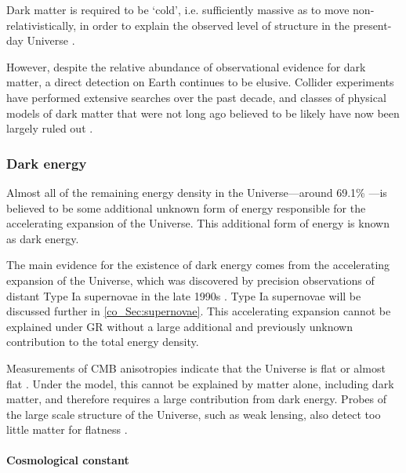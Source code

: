 Dark matter is required to be `cold', i.e. sufficiently massive as to move non-relativistically, in order to explain the observed level of structure in the present-day Universe \citep{Bond1982, Blumenthal1982, Peebles1982, Blumenthal1984, Davis1985}.

However, despite the relative abundance of observational evidence for dark matter, a direct detection on Earth continues to be elusive. Collider experiments have performed extensive searches over the past decade, and classes of physical models of dark matter that were not long ago believed to be likely have now been largely ruled out \citep{Trevisani2018, Aaboud2018, ATLAS2019}.

\subsubsection{Dark energy}
\label{co_Sec:dark_energy}

Almost all of the remaining energy density in the Universe---around 69.1\% \citep{Planck2018VI}---is believed to be some additional unknown form of energy responsible for the accelerating expansion of the Universe. This additional form of energy is known as dark energy.


The main evidence for the existence of dark energy comes from the accelerating expansion of the Universe, which was discovered by precision observations of distant Type Ia supernovae in the late 1990s \citep{Riess1998, Perlmutter1999}. Type Ia supernovae will be discussed further in \autoref{co_Sec:supernovae}. This accelerating expansion cannot be explained under GR without a large additional and previously unknown contribution to the total energy density.

Measurements of CMB anisotropies indicate that the Universe is flat or almost flat \citep{Planck2018VI}. Under the \lcdm{} model, this cannot be explained by matter alone, including dark matter, and therefore requires a large contribution from dark energy. Probes of the large scale structure of the Universe, such as weak lensing, also detect too little matter for flatness \citep[e.g.][]{DES2021}.


\paragraph{Cosmological constant}

